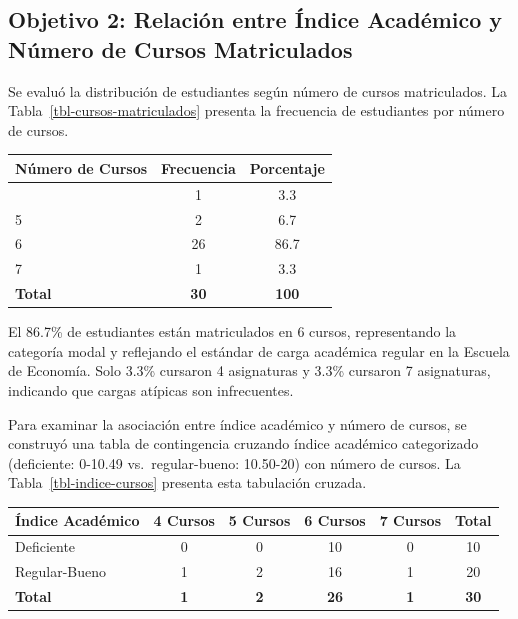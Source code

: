 \documentclass[
  stu,
  floatsintext,
  longtable,
  a4paper,
  nolmodern,
  notxfonts,
  notimes,
  12pt,
  colorlinks=true,linkcolor=blue,citecolor=blue,urlcolor=blue]{apa7}
\newcounter{none} %
\begin{document}
\subsection{Objetivo 2: Relación entre Índice Académico y Número de
Cursos
Matriculados}\label{objetivo-2-relaciuxf3n-entre-uxedndice-acaduxe9mico-y-nuxfamero-de-cursos-matriculados}

Se evaluó la distribución de estudiantes según número de cursos
matriculados. La Tabla~\ref{tbl-cursos-matriculados} presenta la
frecuencia de estudiantes por número de cursos.

\begin{table}

{\caption{{Distribución de Estudiantes según Número de Cursos
Matriculados}{\label{tbl-cursos-matriculados}}}}

{\def\LTcaptype{none} %
\begin{longtable}[]{@{}lcc@{}}
\toprule\noalign{}
Número de Cursos & Frecuencia & Porcentaje \\
\midrule\noalign{}
\endhead
\bottomrule\noalign{}
\endlastfoot
4 & 1 & 3.3 \\
5 & 2 & 6.7 \\
6 & 26 & 86.7 \\
7 & 1 & 3.3 \\
\textbf{Total} & \textbf{30} & \textbf{100} \\
\end{longtable}
}

\end{table}

El 86.7\% de estudiantes están matriculados en 6 cursos, representando
la categoría modal y reflejando el estándar de carga académica regular
en la Escuela de Economía. Solo 3.3\% cursaron 4 asignaturas y 3.3\%
cursaron 7 asignaturas, indicando que cargas atípicas son infrecuentes.

Para examinar la asociación entre índice académico y número de cursos,
se construyó una tabla de contingencia cruzando índice académico
categorizado (deficiente: 0-10.49 vs.~regular-bueno: 10.50-20) con
número de cursos. La Tabla~\ref{tbl-indice-cursos} presenta esta
tabulación cruzada.

\begin{table}

{\caption{{Tabla Cruzada Índice Académico y Número de Cursos
Matriculados}{\label{tbl-indice-cursos}}}}

{\def\LTcaptype{none} %
\begin{longtable}[]{@{}lccccc@{}}
\toprule\noalign{}
Índice Académico & 4 Cursos & 5 Cursos & 6 Cursos & 7 Cursos & Total \\
\midrule\noalign{}
\endhead
\bottomrule\noalign{}
\endlastfoot
Deficiente & 0 & 0 & 10 & 0 & 10 \\
Regular-Bueno & 1 & 2 & 16 & 1 & 20 \\
\textbf{Total} & \textbf{1} & \textbf{2} & \textbf{26} & \textbf{1} &
\textbf{30} \\
\end{longtable}
}

\end{table}
\end{document}
